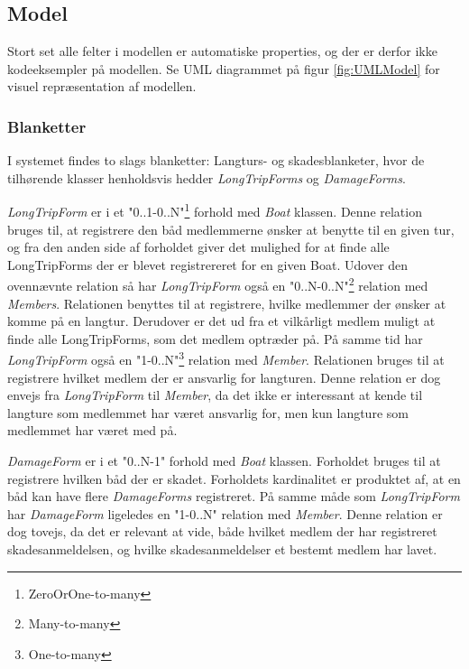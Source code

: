 \subsection*{Model}
Stort set alle felter i modellen er automatiske properties, og der er derfor ikke kodeeksempler på modellen. Se UML diagrammet på figur \ref{fig:UMLModel} for visuel repræsentation af modellen.


\subsubsection*{Blanketter}
I systemet findes to slags blanketter: Langturs- og skadesblanketer, hvor de tilhørende klasser henholdsvis hedder \textit{LongTripForms} og \textit{DamageForms}.

\textit{LongTripForm} er i et "0..1-0..N"\footnote{ZeroOrOne-to-many} forhold med \textit{Boat} klassen. Denne relation bruges til, at registrere den båd medlemmerne ønsker at benytte til en given tur, og fra den anden side af forholdet giver det mulighed for at finde alle LongTripForms der er blevet registrereret for en given Boat. Udover den ovennævnte relation så har \textit{LongTripForm} også en "0..N-0..N"\footnote{Many-to-many} relation med \textit{Members}. Relationen benyttes til at registrere, hvilke medlemmer der ønsker at komme på en langtur. Derudover er det ud fra et vilkårligt medlem muligt at finde alle LongTripForms, som det medlem optræder på. På samme tid har \textit{LongTripForm} også en "1-0..N"\footnote{One-to-many} relation med \textit{Member}. Relationen bruges til at registrere hvilket medlem der er ansvarlig for langturen. Denne relation er dog envejs fra \textit{LongTripForm} til \textit{Member}, da det ikke er interessant at kende til langture som medlemmet har været ansvarlig for, men kun langture som medlemmet har været med på.

\textit{DamageForm} er i et "0..N-1" forhold med \textit{Boat} klassen. Forholdet bruges til at registrere hvilken båd der er skadet. Forholdets kardinalitet er produktet af, at en båd kan have flere \textit{DamageForms} registreret. På samme måde som \textit{LongTripForm} har \textit{DamageForm} ligeledes en "1-0..N" relation med \textit{Member}. Denne relation er dog tovejs, da det er relevant at vide, både hvilket medlem der har registreret skadesanmeldelsen, og hvilke skadesanmeldelser et bestemt medlem har lavet.

